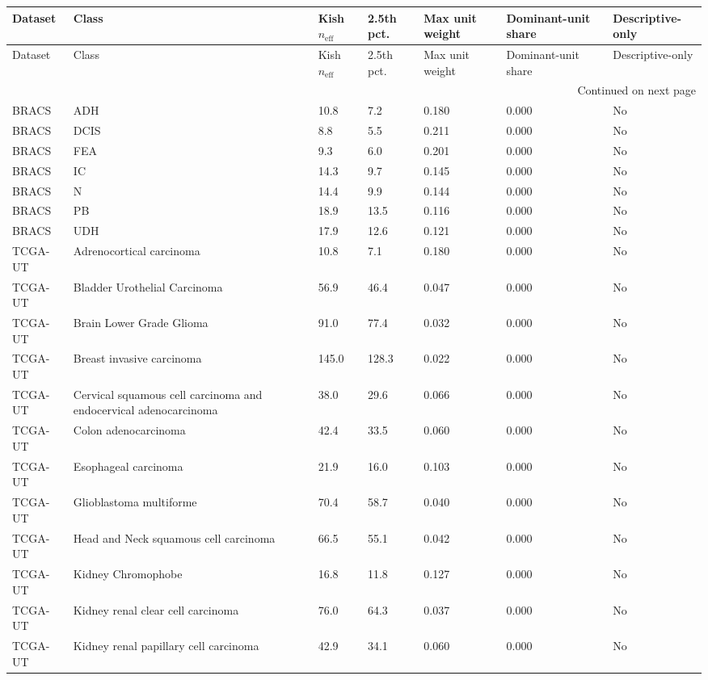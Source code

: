 \begin{longtable}{lllllll}
\toprule
Dataset & Class & Kish $n_{\mathrm{eff}}$ & 2.5th pct. & Max unit weight & Dominant-unit share & Descriptive-only \\
\midrule
\endfirsthead
\toprule
Dataset & Class & Kish $n_{\mathrm{eff}}$ & 2.5th pct. & Max unit weight & Dominant-unit share & Descriptive-only \\
\midrule
\endhead
\midrule
\multicolumn{7}{r}{Continued on next page} \\
\midrule
\endfoot
\bottomrule
\endlastfoot
BRACS & ADH & 10.8 & 7.2 & 0.180 & 0.000 & No \\
BRACS & DCIS & 8.8 & 5.5 & 0.211 & 0.000 & No \\
BRACS & FEA & 9.3 & 6.0 & 0.201 & 0.000 & No \\
BRACS & IC & 14.3 & 9.7 & 0.145 & 0.000 & No \\
BRACS & N & 14.4 & 9.9 & 0.144 & 0.000 & No \\
BRACS & PB & 18.9 & 13.5 & 0.116 & 0.000 & No \\
BRACS & UDH & 17.9 & 12.6 & 0.121 & 0.000 & No \\
TCGA-UT & Adrenocortical carcinoma & 10.8 & 7.1 & 0.180 & 0.000 & No \\
TCGA-UT & Bladder Urothelial Carcinoma & 56.9 & 46.4 & 0.047 & 0.000 & No \\
TCGA-UT & Brain Lower Grade Glioma & 91.0 & 77.4 & 0.032 & 0.000 & No \\
TCGA-UT & Breast invasive carcinoma & 145.0 & 128.3 & 0.022 & 0.000 & No \\
TCGA-UT & Cervical squamous cell carcinoma and endocervical adenocarcinoma & 38.0 & 29.6 & 0.066 & 0.000 & No \\
TCGA-UT & Colon adenocarcinoma & 42.4 & 33.5 & 0.060 & 0.000 & No \\
TCGA-UT & Esophageal carcinoma & 21.9 & 16.0 & 0.103 & 0.000 & No \\
TCGA-UT & Glioblastoma multiforme & 70.4 & 58.7 & 0.040 & 0.000 & No \\
TCGA-UT & Head and Neck squamous cell carcinoma & 66.5 & 55.1 & 0.042 & 0.000 & No \\
TCGA-UT & Kidney Chromophobe & 16.8 & 11.8 & 0.127 & 0.000 & No \\
TCGA-UT & Kidney renal clear cell carcinoma & 76.0 & 64.3 & 0.037 & 0.000 & No \\
TCGA-UT & Kidney renal papillary cell carcinoma & 42.9 & 34.1 & 0.060 & 0.000 & No \\

\end{longtable}
